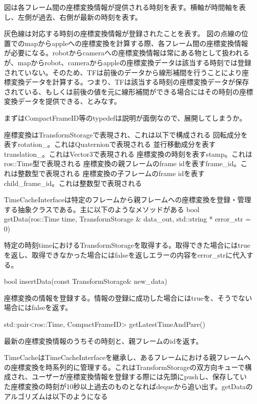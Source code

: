 \documentclass[a4paper]{jreport}	%
\begin{document}

図は各フレーム間の座標変換情報が提供される時刻を表す。横軸が時間軸を表し、左側が過去、右側が最新の時刻を表す。

灰色線は対応する時刻の座標変換情報が登録されたことを表す。
図の点線の位置でのmapからappleへの座標変換を計算する際、各フレーム間の座標変換情報が必要になる。robotからcameraへの座標変換情報は常にある物として扱われるが、mapからrobot、cameraからappleの座標変換データは該当する時刻では登録されていない。そのため、TFは前後のデータから線形補間を行うことにより座標変換データを計算する。つまり、TFは該当する時刻の座標変換データが保存されている、もしくは前後の値を元に線形補間ができる場合にはその時刻の座標変換データを提供できる、とみなす。





まずはCompactFrameID等のtypedefは説明が面倒なので、展開してしまうか。


座標変換はTransformStorageで表現され、これは以下で構成される
回転成分を表すrotation\_。これはQuaternionで表現される
並行移動成分を表すtranslation\_。これはVector3で表現される
座標変換の時刻を表すstamp。これはros::Time型で表現される
座標変換の親フレームのframe idを表すframe\_id。これは整数型で表現される
座標変換の子フレームのframe idを表すchild\_frame\_id。これは整数型で表現される

TimeCacheInterfaceは特定のフレームから親フレームへの座標変換を登録・管理する抽象クラスである。主に以下のようなメソッドがある
bool getData(ros::Time time, TransformStorage \& data\_out, std::string * error\_str = 0)

特定の時刻timeにおけるTransformStorageを取得する。取得できた場合にはtrueを返し、取得できなかった場合にはfalseを返しエラーの内容をerror\_strに代入する。

bool insertData(const TransformStorage\& new\_data)

座標変換の情報を登録する。情報の登録に成功した場合にはtrueを、そうでない場合にはfalseを返す。

std::pair<ros::Time, CompactFrameID> getLatestTimeAndPare()

最新の座標変換情報のうちその時刻と、親フレームのidを返す。


TimeCacheはTimeCacheInterfaceを継承し、あるフレームにおける親フレームへの座標変換を時系列的に管理する。これはTransformStorageの双方向キューで構成され、ユーザーが座標変換情報を登録する際には先頭にpushし、保存していた座標変換の時刻が10秒以上過去のものとなればdequeから追い出す。getDataのアルゴリズムは以下のようになる
\end{document}

